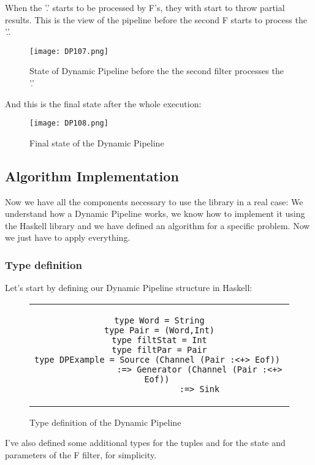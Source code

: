 When the '.' starts to be processed by F's, they with start to throw partial results.
This is the view of the pipeline before the second F starts to process the '.'.

\begin{figure}[H]
    \centering
    \texttt{[image: DP107.png]}
    \caption[{[Lib]} Counting words state 3]{State of Dynamic Pipeline before the the second filter processes the '.'}
    \label{fig:DP107}
\end{figure}

And this is the final state after the whole execution:

\begin{figure}[H]
    \centering
    \texttt{[image: DP108.png]}
    \caption[{[Lib]} Counting words final state]{Final state of the Dynamic Pipeline}
    \label{fig:DP108}
\end{figure}

\subsection{Algorithm Implementation}
Now we have all the components necessary to use the library in a real case: We understand how a Dynamic Pipeline works, we know how to implement it using the Haskell library and we have defined an algorithm for a specific problem. Now we just have to apply everything.
\subsubsection*{Type definition}
Let's start by defining our Dynamic Pipeline structure in Haskell:

\begin{figure}[H]
    \begin{tabular}{c}
        \begin{lstlisting}
type Word = String
type Pair = (Word,Int)
type filtStat = Int
type filtPar = Pair
type DPExample = Source (Channel (Pair :<+> Eof)) 
                :=> Generator (Channel (Pair :<+> Eof)) 
                :=> Sink
        \end{lstlisting}
    \end{tabular}
    \caption[{[Code]} Implementation 1]{Type definition of the Dynamic Pipeline}
    \label{fig:HC16}
\end{figure}

I've also defined some additional types for the tuples and for the state and parameters of the F filter, for simplicity.

